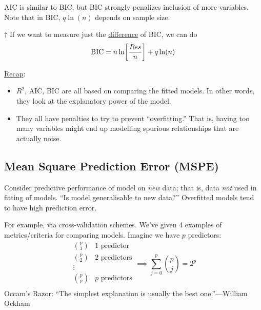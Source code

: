 \begin{Remark}{}{}
    AIC is similar to BIC, but BIC strongly penalizes
    inclusion of more variables. Note that in BIC,
    $ q\ln(n) $ depends on sample size.
\end{Remark}
\begin{Remark}{$ \dagger $}{}
    If we want to measure
    just the \underline{difference} of BIC, we can do
    \[ \text{BIC}=n\ln\biggl[ \frac{\relax{Res}}{n} \biggr]+q\ln(n) \]
\end{Remark}
\underline{Recap}:
\begin{itemize}
    \item $ R^2 $, AIC, BIC
          are all based on comparing the fitted models.
          In other words, they look at the explanatory power of
          the model.
    \item They all have penalties to try to prevent
          ``overfitting.'' That is, having too many
          variables might end up modelling
          spurious relationships that are actually
          noise.
\end{itemize}

\subsection*{Mean Square Prediction Error (MSPE)}
Consider predictive performance of model on \emph{new}
data; that is, data \emph{not} used in fitting
of models. ``Is model generalisable to new data?''
Overfitted models tend to have high prediction error.

For example, via cross-validation schemes.
We've given 4 examples of metrics/criteria for comparing
models. Imagine we have $ p $ predictors:
\[ \begin{matrix}
        \binom{p}{1} & 1 \text{ predictor}  \\
        \binom{p}{2} & 2 \text{ predictors} \\
        \vdots                              \\
        \binom{p}{p} & p \text{ predictors} \\
    \end{matrix}
    \implies
    \sum_{j=0}^{p}\binom{p}{j}=2^p
\]
Occam's Razor: ``The simplest explanation is
usually the best one.''---William Ockham
